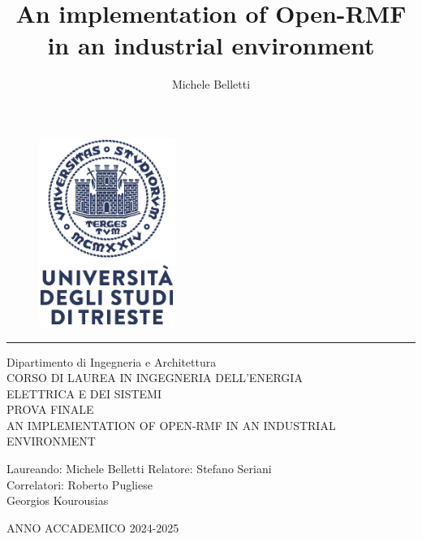 \documentclass[12pt,a4paper,twoside]{report}%
\title{An implementation of Open-RMF in an industrial environment}
\author{Michele Belletti}
\begin{document}
\begin{figure}[h]
	\centering
	\includegraphics[width=0.3\linewidth]{img/units_simbl.png}
\end{figure}
\hrule
\vspace*{10mm}
\begin{center}
{\large 	Dipartimento di Ingegneria e Architettura\\
	\vspace*{7mm}
	CORSO DI LAUREA IN INGEGNERIA DELL'ENERGIA\\ ELETTRICA E DEI SISTEMI\\
	\vspace*{7mm}
	PROVA FINALE\\}
\vspace{10mm}
{\huge AN IMPLEMENTATION OF\vspace{5mm}
OPEN-RMF IN AN\vspace{5mm}
INDUSTRIAL ENVIRONMENT}
\end{center}
\vspace{30mm}
Laureando: Michele Belletti
\mbox{}\hfill Relatore: \hspace{7.5mm} Stefano Seriani\\
\mbox{}\hfill Correlatori: \hspace{4mm} Roberto Pugliese\\
\mbox{}\hfill Georgios Kourousias\\
\vspace{30mm}

\begin{center}
	ANNO ACCADEMICO 2024-2025
\end{center}

\tableofcontents








%
\printbibliography
\end{document}
